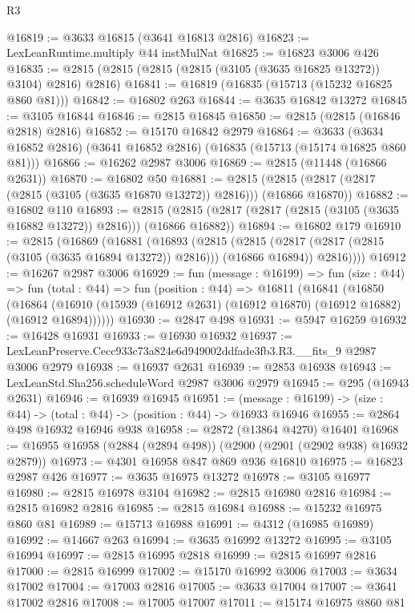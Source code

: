 \begin{lexlean}{R3}
\begin{coremodule}
@16819 := @3633 @16815 (@3641 @16813 @2816)
@16823 := LexLeanRuntime.multiply @44 instMulNat
@16825 := @16823 @3006 @426
@16835 := @2815 (@2815 (@2815 (@2815 (@3105 (@3635 @16825 @13272)) @3104) @2816) @2816)
@16841 := @16819 (@16835 (@15713 (@15232 @16825 @860 @81)))
@16842 := @16802 @263
@16844 := @3635 @16842 @13272
@16845 := @3105 @16844
@16846 := @2815 @16845
@16850 := @2815 (@2815 (@16846 @2818) @2816)
@16852 := @15170 @16842 @2979
@16864 := @3633 (@3634 @16852 @2816) (@3641 @16852 @2816) (@16835 (@15713 (@15174 @16825 @860 @81)))
@16866 := @16262 @2987 @3006
@16869 := @2815 (@11448 (@16866 @2631))
@16870 := @16802 @50
@16881 := @2815 (@2815 (@2817 (@2817 (@2815 (@3105 (@3635 @16870 @13272)) @2816))) (@16866 @16870))
@16882 := @16802 @110
@16893 := @2815 (@2815 (@2817 (@2817 (@2815 (@3105 (@3635 @16882 @13272)) @2816))) (@16866 @16882))
@16894 := @16802 @179
@16910 := @2815
    (@16869
      (@16881
        (@16893
          (@2815
            (@2815 (@2817 (@2817 (@2815 (@3105 (@3635 @16894 @13272)) @2816))) (@16866 @16894))
            @2816))))
@16912 := @16267 @2987 @3006
@16929 := fun (message : @16199) =>
  fun (size : @44) =>
  fun (total : @44) =>
  fun (position : @44) =>
  @16811
    (@16841
      (@16850
        (@16864 (@16910 (@15939 (@16912 @2631) (@16912 @16870) (@16912 @16882) (@16912 @16894))))))
@16930 := @2847 @498
@16931 := @5947 @16259
@16932 := @16428 @16931
@16933 := @16930 @16932
@16937 := LexLeanPreserve.Cecc933c73a824e6d949002ddfade3fb3.R3.__fits_9 @2987 @3006 @2979
@16938 := @16937 @2631
@16939 := @2853 @16938
@16943 := LexLeanStd.Sha256.scheduleWord @2987 @3006 @2979
@16945 := @295 (@16943 @2631)
@16946 := @16939 @16945
@16951 := (message : @16199) -> (size : @44) -> (total : @44) -> (position : @44) -> @16933 @16946
@16955 := @2864 @498 @16932 @16946 @938
@16958 := @2872 (@13864 @4270) @16401
@16968 := @16955 @16958 (@2884 (@2894 @498)) (@2900 (@2901 (@2902 @938) @16932 @2879))
@16973 := @4301 @16958 @847 @869 @936 @16810
@16975 := @16823 @2987 @426
@16977 := @3635 @16975 @13272
@16978 := @3105 @16977
@16980 := @2815 @16978 @3104
@16982 := @2815 @16980 @2816
@16984 := @2815 @16982 @2816
@16985 := @2815 @16984
@16988 := @15232 @16975 @860 @81
@16989 := @15713 @16988
@16991 := @4312 (@16985 @16989)
@16992 := @14667 @263
@16994 := @3635 @16992 @13272
@16995 := @3105 @16994
@16997 := @2815 @16995 @2818
@16999 := @2815 @16997 @2816
@17000 := @2815 @16999
@17002 := @15170 @16992 @3006
@17003 := @3634 @17002
@17004 := @17003 @2816
@17005 := @3633 @17004
@17007 := @3641 @17002 @2816
@17008 := @17005 @17007
@17011 := @15174 @16975 @860 @81

\end{coremodule}
\end{lexlean}
